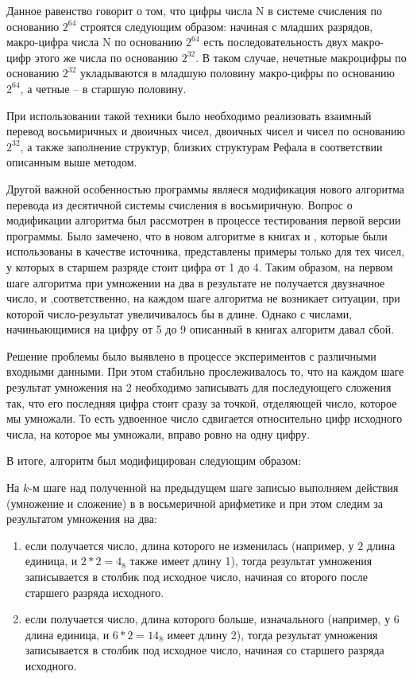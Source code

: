 \documentclass[14pt, russian]{scrartcl}
\begin{document}
Данное равенство говорит о том, что цифры числа N в системе счисления по основанию $2^{64}$ строятся следующим образом: начиная с младших разрядов, макро-цифра числа N по основанию $2^{64}$ есть последовательность двух макро-цифр этого же числа по основанию $2^{32}$. В таком случае, нечетные макроцифры по основанию $2^{32}$ укладываются в младшую половину макро-цифры по основанию $2^{64}$, а четные -- в старшую половину.

При использовании такой техники было необходимо реализовать взаимный перевод восьмиричных и двоичных чисел, двоичных чисел и чисел по основанию $2^{32}$, а также заполнение структур, близких структурам Рефала в соответствии описанным выше методом.

Другой важной особенностью программы являеся модификация нового алгоритма перевода из десятичной системы счисления в восьмиричную. Вопрос о модификации алгоритма был рассмотрен в процессе тестирования первой версии программы. Было замечено, что в новом алгоритме в книгах \cite{CountSystems} и \cite{ComputerArithm}, которые были использованы в качестве источника, представлены примеры только для тех чисел, у которых в старшем разряде стоит цифра от 1 до 4. Таким образом, на первом шаге алгоритма при умножении на два в результате не получается двузначное число, и ,соответственно, на каждом шаге алгоритма не возникает ситуации, при которой число-результат увеличивалось бы в длине. Однако с числами, начиньающимися на цифру от 5 до 9 описанный в книгах алгоритм давал сбой.

Решение проблемы было выявлено в процессе экспериментов с различными входными данными. При этом стабильно прослеживалось то, что на каждом шаге результат умножения на 2 необходимо записывать для последующего сложения так, что его последняя цифра стоит сразу за точкой, отделяющей число, которое мы умножали. То есть удвоенное число сдвигается относительно цифр исходного числа, на которое мы умножали, вправо ровно на одну цифру.

В итоге, алгоритм был модифицирован следующим образом: 

На $k$-м шаге над полученной на предыдущем шаге записью выполняем действия (умножение и сложение) в в восьмеричной арифметике и при этом следим за результатом умножения на два:
\begin{enumerate}
    \item если получается число, длина которого не изменилась (например, у $2$ длина единица, и $2*2 =4_8$ также имеет длину 1), тогда результат умножения записывается в столбик под исходное число, начиная со второго после старшего разряда исходного.
    \item если получается число, длина которого больше, изначального (например, у $6$ длина единица, и $6*2 =14_8$ имеет длину 2), тогда результат умножения записывается в столбик под исходное число, начиная со старшего разряда исходного.
\end{enumerate}
\end{document}

